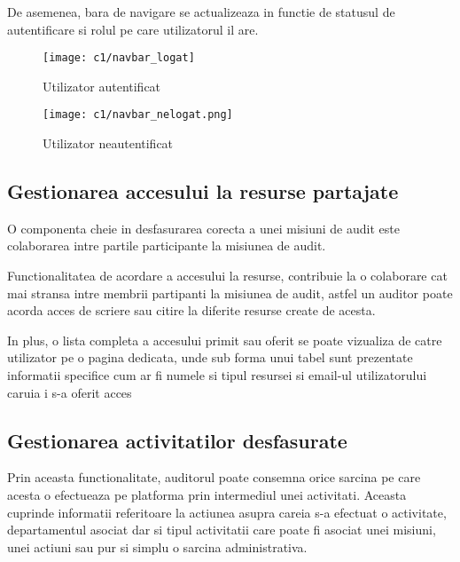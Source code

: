 \newpage
   De asemenea, bara de navigare se actualizeaza in functie de statusul de autentificare si rolul pe care utilizatorul il are.
   \begin{figure}[h]
   	\centering
   	\begin{minipage}{.5\textwidth}
   		\centering
   		\texttt{[image: c1/navbar\_logat]}
   		\caption{Utilizator autentificat}
   		
   	\end{minipage}%
   	\begin{minipage}{.5\textwidth}
   		\centering
   		\texttt{[image: c1/navbar\_nelogat.png]}
   		\caption{Utilizator neautentificat}
   		
   	\end{minipage}
   	
   	
   \end{figure}

	\subsection{Gestionarea accesului la resurse partajate}
	
	 O componenta cheie in desfasurarea corecta a unei misiuni de audit este colaborarea intre partile participante la misiunea de audit.
	 
		Functionalitatea de acordare a accesului la resurse, contribuie la o colaborare cat mai stransa intre membrii partipanti la misiunea de audit, astfel un auditor poate acorda acces de scriere sau citire la diferite resurse create de acesta.
		
		In plus, o lista completa a accesului primit sau oferit se poate vizualiza de catre utilizator pe o pagina dedicata, unde sub forma unui tabel sunt prezentate informatii specifice cum ar fi numele si tipul resursei si email-ul utilizatorului caruia i s-a oferit  acces
		
	\subsection{Gestionarea activitatilor desfasurate}
	 Prin aceasta functionalitate, auditorul poate consemna orice sarcina pe care acesta o efectueaza pe platforma prin intermediul unei activitati. Aceasta cuprinde informatii referitoare la actiunea asupra careia s-a efectuat o activitate, departamentul asociat dar si tipul activitatii care poate fi asociat unei misiuni, unei actiuni sau pur si simplu o sarcina administrativa.
	 
